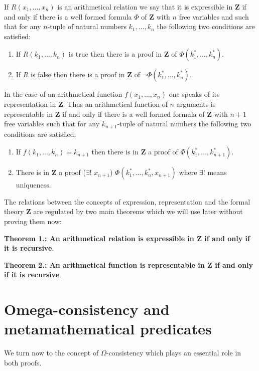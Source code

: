 \documentclass[12pt]{article}
\begin{document}
If $R (x_1, \ldots, x_n)$ is an arithmetical relation we say that it is expressible in $\textbf{Z}$ if and only if there is a well formed formula $\Phi$ of $\textbf{Z}$ with $n$ free variables and such that for any $n$-tuple of natural numbers $k_1, \ldots, k_n$ the following two conditions are satisfied:

\begin{enumerate}
\item If $R (k_1, \ldots, k_n)$ is true then there is a proof in $\textbf{Z}$ of $\Phi (k^*_1, \ldots, k^*_n).$
\item If $R$ is false then there is a proof in $\textbf{Z}$ of $\neg \Phi (k^*_1, \ldots, k^*_n).$
\end{enumerate}

In the case of an arithmetical function $f (x_1, \ldots, x_n)$ one speaks of its representation in $\textbf{Z}$. Thus an arithmetical function of $n$ arguments is representable in $\textbf{Z}$ if and only if there is a well formed formula of $\textbf{Z}$ with $n + 1$ free variables such that for any $k_{n+1}$-tuple of natural numbers the following two conditions are satisfied:

\begin{enumerate}
\item If $f (k_1, \ldots, k_n) = k_{n+1}$ then there is in $\textbf{Z}$ a proof of $\Phi (k^*_1, \ldots, k^*_{n+1}).$
\item There is in $\textbf{Z}$ a proof ($\exists$! $x_{n+1}$) $\Phi (k^*_1, \ldots, k^*_n, x_{n+1})$ where $\exists$! means uniqueness.
\end{enumerate}

The relations between  the concepts of  expression, representation and the formal theory $\textbf{Z}$ are regulated by two main theorems which we will use later  without proving them now:

\textbf{Theorem 1.: An arithmetical relation is expressible in $\textbf{Z}$ if and only if it is recursive}.

\textbf{Theorem 2.: An arithmetical function is representable in $\textbf{Z}$ if and only if it is recursive}.

\section{Omega-consistency and metamathematical predicates}\normalsize

We turn now to the concept of $\Omega$-consistency which plays an essential role in both proofs.
\end{document}
